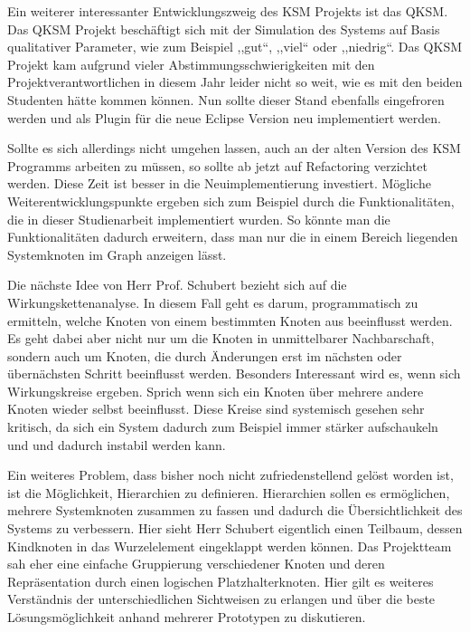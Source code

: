 Ein weiterer interessanter Entwicklungszweig des KSM Projekts ist das QKSM. Das QKSM Projekt beschäftigt sich mit der Simulation des Systems auf Basis qualitativer Parameter, wie zum Beispiel ,,gut``, ,,viel`` oder ,,niedrig``. Das QKSM Projekt kam aufgrund vieler Abstimmungsschwierigkeiten mit den Projektverantwortlichen in diesem Jahr leider nicht so weit, wie es mit den beiden Studenten hätte kommen können. Nun sollte dieser Stand ebenfalls eingefroren werden und als Plugin für die neue Eclipse Version neu implementiert werden.

Sollte es sich allerdings nicht umgehen lassen, auch an der alten Version des KSM Programms arbeiten zu müssen, so sollte ab jetzt auf Refactoring verzichtet werden. Diese Zeit ist besser in die Neuimplementierung investiert. Mögliche Weiterentwicklungspunkte ergeben sich zum Beispiel durch die Funktionalitäten, die in dieser Studienarbeit implementiert wurden. So könnte man die Funktionalitäten dadurch erweitern, dass man nur die in einem Bereich liegenden Systemknoten im Graph anzeigen lässt. 

Die nächste Idee von Herr Prof. Schubert bezieht sich auf die Wirkungskettenanalyse. In diesem Fall geht es darum, programmatisch zu ermitteln, welche Knoten von einem bestimmten Knoten aus beeinflusst werden. Es geht dabei aber nicht nur um die Knoten in unmittelbarer Nachbarschaft, sondern auch um Knoten, die durch Änderungen erst im nächsten oder übernächsten Schritt beeinflusst werden. Besonders Interessant wird es, wenn sich Wirkungskreise ergeben. Sprich wenn sich ein Knoten über mehrere andere Knoten wieder selbst beeinflusst. Diese Kreise sind systemisch gesehen sehr kritisch, da sich ein System dadurch zum Beispiel immer stärker aufschaukeln und und dadurch instabil werden kann.

Ein weiteres Problem, dass bisher noch nicht zufriedenstellend gelöst worden ist, ist die Möglichkeit, Hierarchien zu definieren. Hierarchien sollen es ermöglichen, mehrere Systemknoten zusammen zu fassen und dadurch die Übersichtlichkeit des Systems zu verbessern. Hier sieht Herr Schubert eigentlich einen Teilbaum, dessen Kindknoten in das Wurzelelement eingeklappt werden können. Das Projektteam sah eher eine einfache Gruppierung verschiedener Knoten und deren Repräsentation durch einen logischen Platzhalterknoten. Hier gilt es weiteres Verständnis der unterschiedlichen Sichtweisen zu erlangen und über die beste Lösungsmöglichkeit anhand mehrerer Prototypen zu diskutieren.